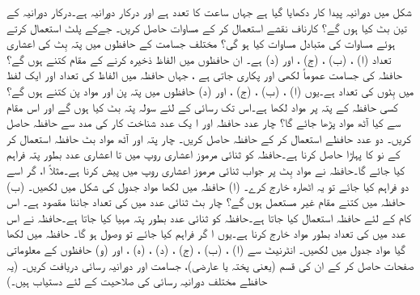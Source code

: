  شکل  میں دورانیہ پیدا کار دکھایا گیا ہے جہاں  ساعت کا تعدد  ہے اور درکار دورانیہ   ہے۔درکار دورانیہ کے تین بٹ کیا ہوں گے؟
 کارناف نقشے  استعمال  کر کے  مساوات  حاصل کریں۔
جےکے پلٹ استعمال کرتے ہوئے  مساوات   کی متبادل مساوات   کیا ہو گی؟
  مختلف جسامت کے حافظوں میں پتہ بِٹ  کی  اعشاری تعداد  (ا) ، (ب) ، (ج) ، اور  (د)  ہے۔  ان حافظوں میں الفاظ ذخیرہ کرنے کے  مقام کتنے  ہوں گے؟
 حافظہ کی  جسامت  عموماً  لکھی اور پکاری جاتی ہے ، جہاں   حافظہ میں الفاظ کی تعداد اور  ایک لفظ میں بِٹوں کی تعداد  ہے۔یوں  (ا) ،  (ب)   ، (ج)  ، اور (د)     حافظوں میں پتہ پن  اور  مواد پن کتنے  ہوں گے؟
 کسی حافظہ کے   پتہ پر  مواد لکھا ہے۔اس تک رسائی کے لئے سولہ پتہ بٹ کیا ہوں گے اور اس  مقام سے کیا  آٹھ مواد  پڑھا جائے گا؟
 چار عدد  حافظہ  اور ا یک عدد  شناخت کار کی مدد سے  حافظہ حاصل کریں۔
 دو عدد  حافظے  استعمال  کر کے  حافظہ حاصل کریں۔
 چار پتہ  اور آٹھ مواد بٹ حافظہ استعمال کر کے  نو کا  پہاڑا حاصل کرنا ہے۔حافظہ کو  ثنائی مرموز اعشاری  روپ میں  تا  اعشاری عدد بطور پتہ فراہم کیا جائے گا۔حافظہ نے مواد  بِٹ پر جواب ثنائی  مرموز اعشاری  روپ میں پیش کرنا ہے۔مثلاً ا، گر اسے دو  فراہم کیا جائے تو یہ اٹھارہ   خارج کرے۔ (ا) حافظہ میں لکھا مواد جدول کی شکل میں لکھیں۔ (ب) حافظہ میں کتنے مقام غیر مستعمل ہوں گے؟ 
 چار بٹ ثنائی عدد  میں   کی تعداد جاننا مقصود ہے۔ اس کام کے لئے  حافظہ استعمال کیا جاتا ہے۔حافظہ کو ثنائی عدد بطور پتہ مہیا کیا جاتا ہے۔حافظہ نے  اس عدد میں   کی تعداد بطور مواد خارج کرنا ہے۔یوں ا گر    فراہم کیا جائے تو    وصول ہو گا۔ حافظہ میں لکھا گیا مواد جدول میں لکھیں۔
 انٹرنیٹ سے   (ا) ، (ب) ،  (ج) ،  (د)  ، (ہ)  ، اور  (و)    حافظوں  کے  معلوماتی صفحات  حاصل کر کے ان کی قسم (یعنی پختہ یا عارضی)، جسامت اور دورانیہ رسائی دریافت کریں۔ (یہ حافظے مختلف دورانیہ رسائی کی صلاحیت کے لئے دستیاب ہیں۔)
